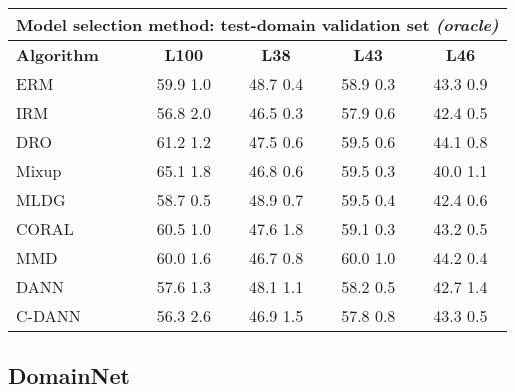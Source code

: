 \documentclass{article}
\begin{document}
\begin{center}
\begin{tabular}{lcccc}
\toprule
\multicolumn{5}{c}{\textbf{Model selection method: test-domain validation set \textit{(oracle)}}} \\
\midrule
\textbf{Algorithm}    & \textbf{L100}             & \textbf{L38}              & \textbf{L43}              & \textbf{L46}              \\
\midrule
ERM                       & 59.9  1.0            & 48.7  0.4            & 58.9  0.3            & 43.3  0.9            \\
IRM                       & 56.8  2.0            & 46.5  0.3            & 57.9  0.6            & 42.4  0.5            \\
DRO                 & 61.2  1.2            & 47.5  0.6            & 59.5  0.6            & 44.1  0.8            \\
Mixup                     & 65.1  1.8            & 46.8  0.6            & 59.5  0.3            & 40.0  1.1            \\
MLDG                      & 58.7  0.5            & 48.9  0.7            & 59.5  0.4            & 42.4  0.6            \\
CORAL                     & 60.5  1.0            & 47.6  1.8            & 59.1  0.3            & 43.2  0.5            \\
MMD                       & 60.0  1.6            & 46.7  0.8            & 60.0  1.0            & 44.2  0.4            \\
DANN                       & 57.6  1.3            & 48.1  1.1            & 58.2  0.5            & 42.7  1.4            \\
C-DANN                   & 56.3  2.6            & 46.9  1.5            & 57.8  0.8            & 43.3  0.5            \\
\bottomrule
\end{tabular}
\end{center}

\clearpage
\newpage
\subsection{DomainNet}
\end{document}
